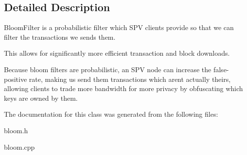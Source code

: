 \subsection{Detailed Description}
Bloom\+Filter is a probabilistic filter which S\+PV clients provide so that we can filter the transactions we sends them.

This allows for significantly more efficient transaction and block downloads.

Because bloom filters are probabilistic, an S\+PV node can increase the false-\/ positive rate, making us send them transactions which aren\textquotesingle{}t actually theirs, allowing clients to trade more bandwidth for more privacy by obfuscating which keys are owned by them. 

The documentation for this class was generated from the following files\+:\begin{DoxyCompactItemize}
\item 
bloom.\+h\item 
bloom.\+cpp\end{DoxyCompactItemize}
